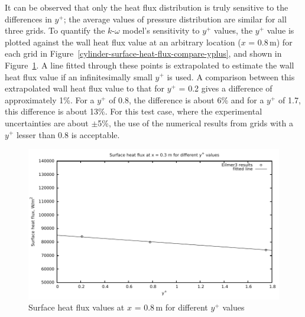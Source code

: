 It can be observed that only the heat flux distribution is truly sensitive to the 
differences in $y^+$; the average values of pressure distribution are similar for 
all three grids. To quantify the $k$-$\omega$ model's sensitivity to $y^+$ values, the 
$y^+$ value is plotted against the wall heat flux value at an arbitrary location 
($x$ = 0.8\,m) for each grid in Figure~\ref{cylinder-surface-heat-flux-compare-yplus},
and shown in Figure~\ref{cylinder-compare-surface-heat-flux-for-different-yplus}. 
A line fitted through these points is extrapolated to estimate the wall heat flux value 
if an infinitesimally small $y^+$ is used. A comparison between this extrapolated 
wall heat flux value to that for $y^+$ = 0.2 gives a difference of approximately 
1\%. For a $y^+$ of 0.8, the difference is about 6\% and for a $y^+$ of 1.7, this
difference is about 13\%. For this test case, where the experimental uncertainties 
are about $\pm$5\%, the use of the numerical results from grids with  a $y^+$ 
lesser than 0.8 is acceptable.
%
\begin{figure}[h]
 \begin{center}
  \includegraphics[width=15cm]{./chap3-mallinson-cylinder/figs/yplus-sensitivity.pdf}
 \end{center}
 \caption{Surface heat flux values at $x$ = 0.8\,m for different $y^+$ values}
 \label{cylinder-compare-surface-heat-flux-for-different-yplus}
\vspace{2cm}
\end{figure}

